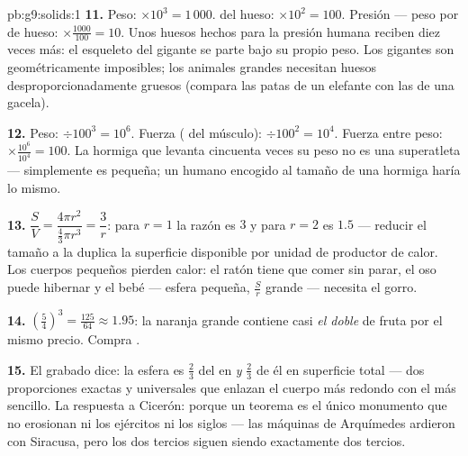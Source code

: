 \begin{solution}{pb:g9:solids:1}
\textbf{11.} Peso: $\times 10^3 = 1\,000$.  del
hueso: $\times 10^2 = 100$. Presión --- peso por
 de hueso: $\times \frac{1000}{100} = 10$. Unos huesos hechos para
la presión humana reciben diez veces más: el esqueleto del gigante
se parte bajo su propio peso. Los gigantes son geométricamente
imposibles; los animales grandes necesitan huesos desproporcionadamente gruesos
(compara las patas de un elefante con las de una gacela).

\textbf{12.} Peso: $\div 100^3 = 10^6$. Fuerza (
del músculo): $\div 100^2 = 10^4$. Fuerza entre peso:
$\times \frac{10^6}{10^4} = 100$. La hormiga que levanta cincuenta veces
su peso no es una superatleta --- simplemente es pequeña; un
humano encogido al tamaño de una hormiga haría lo mismo.

\textbf{13.} $\dfrac{S}{V} = \dfrac{4\pi r^2}{\frac43\pi r^3}
= \dfrac{3}{r}$: para $r = 1$ la razón es $3$ y para $r = 2$ es
$1.5$ --- reducir el tamaño a la  duplica la superficie disponible
por unidad de  productor de calor. Los cuerpos pequeños pierden calor:
el ratón tiene que comer sin parar, el oso puede hibernar y el
bebé --- esfera pequeña, $\frac Sr$ grande --- necesita el gorro.

\textbf{14.} $\left(\frac54\right)^3 = \frac{125}{64} \approx
1.95$: la naranja grande contiene casi \emph{el doble} de fruta por
el mismo precio. Compra .

\textbf{15.} El grabado dice: la esfera es $\frac23$ del
 en  \emph{y} $\frac23$ de él en superficie
total --- dos proporciones exactas y universales que enlazan el
cuerpo más redondo con el más sencillo. La respuesta a Cicerón: porque un
teorema es el único monumento que no erosionan ni los ejércitos ni los siglos
--- las máquinas de Arquímedes ardieron con Siracusa, pero los
dos tercios siguen siendo exactamente dos tercios.
\end{solution}
